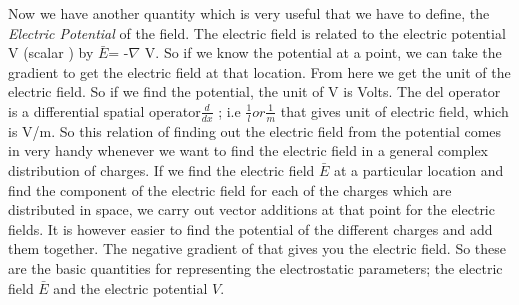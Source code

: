 \begin{mdframed}[ backgroundcolor=lightblue, linewidth=1pt, hidealllines=true]
Now we have another quantity which is very useful that we have to define, the \emph{Electric Potential} of the field. The electric field is related to the electric  potential V (scalar ) by 
$\bar{E}$= -$\nabla $ V.
So if we know the potential at a point, we can take the gradient to get the electric field at that location. From here we get the unit of the electric field. So if we find the potential, the unit of V is Volts. The del operator is a differential spatial operator$\frac{d}{dx}$ ; i.e $\frac{1}{l} or\frac{1}{m}$ that gives unit of electric field, which is V/m. So this relation of finding out the electric field from the potential comes in very handy whenever we want to find the electric field in a general complex distribution of charges. If we find the electric field  $\bar{E}$ at a particular location and find the component of the electric field for each of the charges which are distributed in space, we carry out vector additions at that point for the electric fields. It is however easier to find the potential of the different charges and add them together. The negative gradient of that gives you the electric field. So these are the basic quantities for representing the electrostatic parameters; the electric field  $\bar{E}$ and the electric potential $V$.
\end{mdframed}

